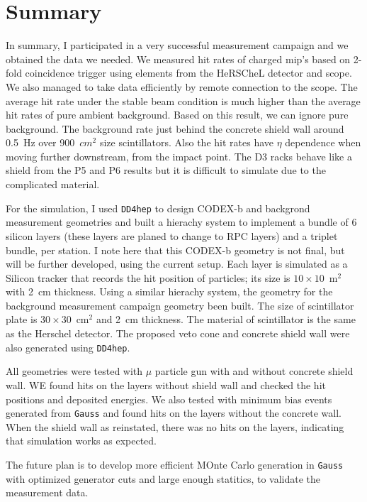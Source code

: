 \section{Summary}
\label{sec:Summary}

In summary, I participated in a very successful measurement campaign and we obtained the data we needed. We measured hit rates of charged mip's based on 2-fold coincidence trigger using elements from the HeRSCheL detector and scope. We also managed to take data efficiently by remote connection to the scope. The average hit rate under the stable beam condition is much higher than the average hit rates of pure ambient background. Based on this result, we can ignore pure background. The background rate just behind the concrete shield wall around 0.5~Hz over 900~$cm^{2}$ size scintillators. Also the hit rates have $\eta$ dependence when moving further downstream, from the impact point. The D3 racks behave like a shield from the P5 and P6 results but it is difficult to simulate due to the complicated material.

For the simulation, I used {\tt DD4hep} to design CODEX-b and backgrond measurement geometries and built a hierachy system to implement a bundle of 6 silicon layers (these layers are planed to change to RPC layers) and a triplet bundle, per station. I note here that this CODEX-b geometry is not final, but will be further developed, using the current setup. Each layer is simulated as a Silicon tracker that records the hit position of particles; its size is $10\times10$~m$^{2}$ with 2~cm thickness. Using a similar hierachy system, the geometry for the background measurement campaign geometry been built. The size of scintillator plate is $30\times30$~cm$^{2}$ and 2~cm thickness. The material of scintillator is the same as the Herschel detector.
The proposed veto cone and concrete shield wall were also generated using {\tt DD4hep}.

All geometries were tested with $\mu$ particle gun with and without concrete shield wall. WE found hits on the layers without shield wall and checked the hit positions and deposited energies. We also tested with minimum bias events generated from {\tt Gauss} and found hits on the layers without the concrete wall. When the shield wall as reinstated, there was no hits on the layers, indicating that simulation works as expected.

The future plan is to develop more efficient MOnte Carlo generation in {\tt Gauss} with optimized generator cuts and large enough statitics, to validate the measurement data.





